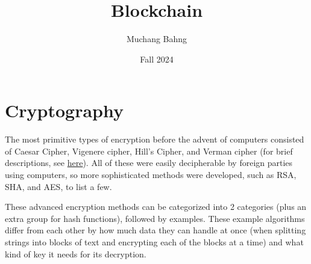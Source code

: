 \documentclass{article}
\newcounter{example}[section]
\newcounter{algo}[section]
\begin{document}
\title{Blockchain}
\author{Muchang Bahng}
\date{Fall 2024}

\maketitle
\tableofcontents
\pagebreak

\section{Cryptography}

    The most primitive types of encryption before the advent of computers consisted of Caesar Cipher, Vigenere cipher, Hill's Cipher, and Verman cipher (for brief descriptions, see \href{/PDF_Notes/Mathematics.pdf#page=447}{here}). All of these were easily decipherable by foreign parties using computers, so more sophisticated methods were developed, such as RSA, SHA, and AES, to list a few.

    These advanced encryption methods can be categorized into 2 categories (plus an extra group for hash functions), followed by examples. These example algorithms differ from each other by how much data they can handle at once (when splitting strings into blocks of text and encrypting each of the blocks at a time) and what kind of key it needs for its decryption.
\end{document}
